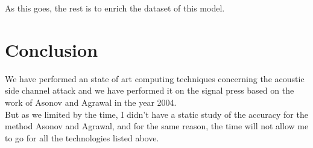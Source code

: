 \documentclass[12pt,a4paper]{article}
\begin{document}
As this goes, the rest is to enrich the dataset of this model. 

\section{Conclusion}

We have performed an state of art computing techniques concerning the acoustic side channel  attack and we have performed it on the signal press based on the work of Asonov and Agrawal in the year 2004. \\

But as we limited by the time, I didn't have a static study of the accuracy for the method Asonov and Agrawal, and for the same reason, the time will not allow me to go for all the technologies listed above.  \\



\end{document}
